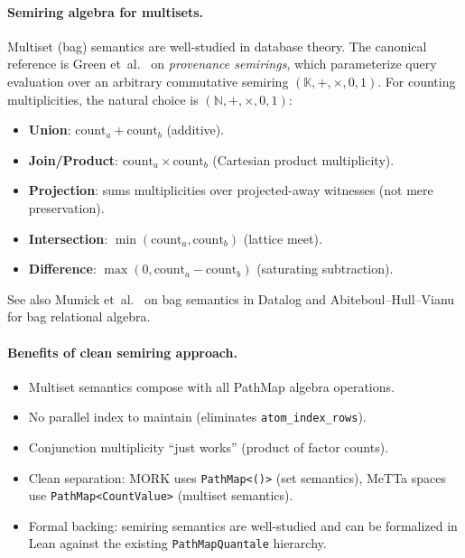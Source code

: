 \documentclass[11pt]{article}
\newcommand{\code}[1]{\texttt{#1}}
\newcommand{\PathMap}{\textup{PathMap}}
\newcommand{\MORK}{\textup{MORK}}
\newcommand{\MeTTa}{\textup{MeTTa}}
\begin{document}
\paragraph{Semiring algebra for multisets.}
Multiset (bag) semantics are well-studied in database theory.  The
canonical reference is Green et~al.~\cite{GreenProvenanceSemirings2007}
on \emph{provenance semirings}, which parameterize query evaluation over
an arbitrary commutative semiring $(\mathbb{K}, +, \times, 0, 1)$.
For counting multiplicities, the natural choice is $(\mathbb{N}, +, \times,
0, 1)$:
\begin{itemize}[nosep]
  \item \textbf{Union}: $\text{count}_a + \text{count}_b$ (additive).
  \item \textbf{Join/Product}: $\text{count}_a \times \text{count}_b$
    (Cartesian product multiplicity).
  \item \textbf{Projection}: sums multiplicities over projected-away
    witnesses (not mere preservation).
  \item \textbf{Intersection}: $\min(\text{count}_a, \text{count}_b)$
    (lattice meet).
  \item \textbf{Difference}: $\max(0, \text{count}_a - \text{count}_b)$
    (saturating subtraction).
\end{itemize}
See also Mumick et~al.~\cite{MumickMagicDuplicates1990} on bag semantics
in Datalog and Abiteboul--Hull--Vianu~\cite{AHV1995} for bag relational
algebra.

\paragraph{Benefits of clean semiring approach.}
\begin{itemize}[nosep]
  \item Multiset semantics compose with all \PathMap{} algebra operations.
  \item No parallel index to maintain (eliminates \code{atom\_index\_rows}).
  \item Conjunction multiplicity ``just works'' (product of factor counts).
  \item Clean separation: \MORK{} uses \code{PathMap<()>} (set semantics),
    \MeTTa{} spaces use \code{PathMap<CountValue>} (multiset semantics).
  \item Formal backing: semiring semantics are well-studied and can be
    formalized in Lean against the existing \code{PathMapQuantale} hierarchy.
\end{itemize}
\end{document}
